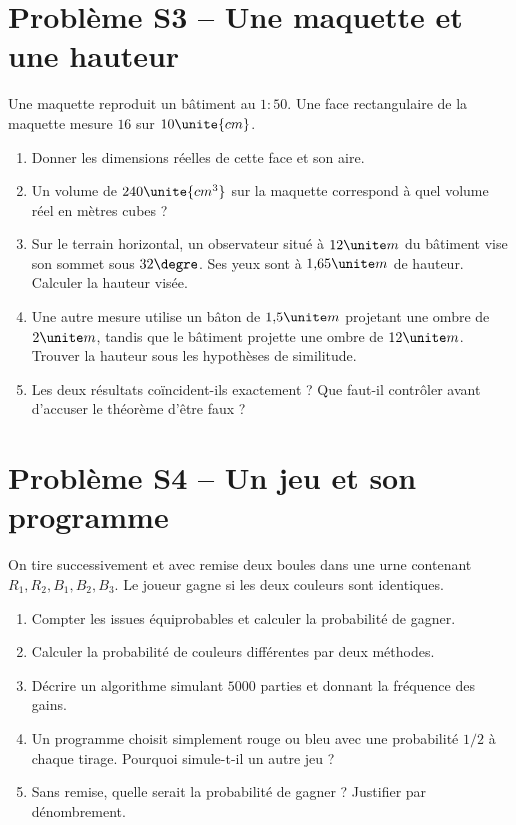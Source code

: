 \section*{Problème S3 -- Une maquette et une hauteur}

Une maquette reproduit un bâtiment au $1:50$. Une face rectangulaire de la maquette mesure $16$ sur $10\unite{cm}$.
\begin{enumerate}
\item Donner les dimensions réelles de cette face et son aire.
\item Un volume de $240\unite{cm^3}$ sur la maquette correspond à quel volume réel en mètres cubes ?
\item Sur le terrain horizontal, un observateur situé à $12\unite m$ du bâtiment vise son sommet sous $32\degre$. Ses yeux sont à $1{,}65\unite m$ de hauteur. Calculer la hauteur visée.
\item Une autre mesure utilise un bâton de $1{,}5\unite m$ projetant une ombre de $2\unite m$, tandis que le bâtiment projette une ombre de $12\unite m$. Trouver la hauteur sous les hypothèses de similitude.
\item Les deux résultats coïncident-ils exactement ? Que faut-il contrôler avant d'accuser le théorème d'être faux ?
\end{enumerate}

\section*{Problème S4 -- Un jeu et son programme}

On tire successivement et avec remise deux boules dans une urne contenant $R_1,R_2,B_1,B_2,B_3$. Le joueur gagne si les deux couleurs sont identiques.
\begin{enumerate}
\item Compter les issues équiprobables et calculer la probabilité de gagner.
\item Calculer la probabilité de couleurs différentes par deux méthodes.
\item Décrire un algorithme simulant $5000$ parties et donnant la fréquence des gains.
\item Un programme choisit simplement rouge ou bleu avec une probabilité $1/2$ à chaque tirage. Pourquoi simule-t-il un autre jeu ?
\item Sans remise, quelle serait la probabilité de gagner ? Justifier par dénombrement.
\end{enumerate}